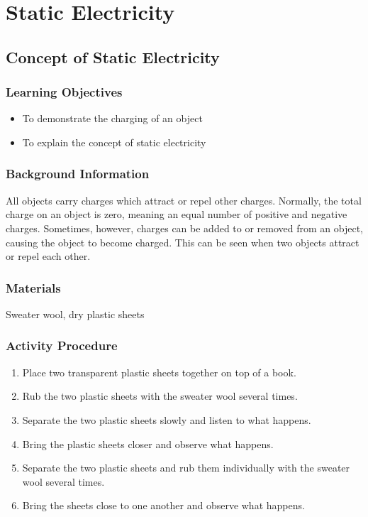 \section{Static Electricity}

\subsection{Concept of Static Electricity}

\subsubsection*{Learning Objectives}
\begin{itemize}
\item{To demonstrate the charging of an object} 
\item{To explain the concept of static electricity} 
\end{itemize}

\subsubsection*{Background Information}
All objects carry charges which attract or repel other charges. Normally, the total charge on an object is zero, meaning an equal number of positive and negative charges. Sometimes, however, charges can be added to or removed from an object, causing the object to become charged. This can be seen when two objects attract or repel each other. 

\subsubsection*{Materials}
Sweater wool, dry plastic sheets

\subsubsection*{Activity Procedure}
\begin{enumerate}
\item{Place two transparent plastic sheets together on top of a book.}
\item{Rub the two plastic sheets with the sweater wool several times.} 
\item{Separate the two plastic sheets slowly and listen to what happens.} 
\item{Bring the plastic sheets closer and observe what happens.} 
\item{Separate the two plastic sheets and rub them individually with the sweater wool several times.} 
\item{Bring the sheets close to one another and observe what happens.} 
\end{enumerate}

